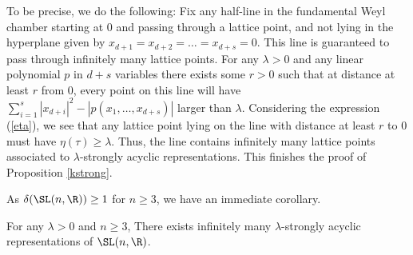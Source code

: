 To be precise, we do the following: Fix any half-line in the fundamental Weyl chamber starting at $0$ and passing through a lattice point, and not lying in the hyperplane given by $x_{d+1}=x_{d+2} = \dots = x_{d+s}=0$. This line is guaranteed to pass through infinitely many lattice points. For any $\lambda>0$ and any linear polynomial $p$ in $d+s$ variables there exists some $r>0$ such that at distance at least $r$ from $0$, every point on this line will have $\sum^s_{i=1}|x_{d+i}|^2-|p(x_1,\dots,x_{d+s})|$ larger than $\lambda$. Considering the expression (\ref{eta}), we see that any lattice point lying on the line with distance at least $r$ to $0$ must have $\eta(\tau)\geq \lambda$. Thus, the line contains infinitely many lattice points associated to $\lambda$-strongly acyclic representations. This finishes the proof of Proposition \ref{kstrong}.

\medskip

\noindent As $\delta(\SL(n,\R))\geq 1$ for $n\geq 3$, we have an immediate corollary.

\begin{cor}
    For any $\lambda>0$ and $n\geq 3$, There exists infinitely many $\lambda$-strongly acyclic representations of $\SL(n,\R)$.
\end{cor}

